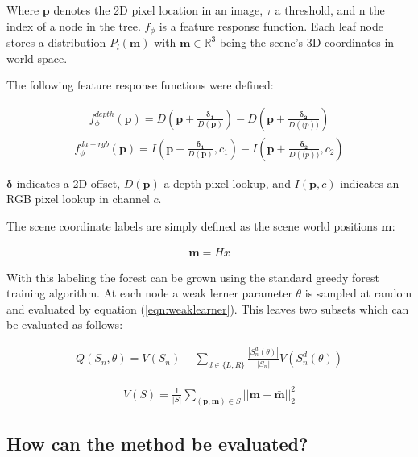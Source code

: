 Where $\mathbf{p}$ denotes the 2D pixel location in an image, $\tau$ a threshold, and n the index of a node in the tree. $f_{\phi}$ is a feature response function. Each leaf node stores a distribution $P_{l}(\mathbf{m})$ with $\mathbf{m} \in \mathbb{R}^3$ being the scene's 3D coordinates in world space.

The following feature response functions were defined:

\begin{eqnarray}
  f_{\phi}^{depth}(\mathbf{p}) = D(\mathbf{p} + \frac{\mathbf{\delta_1}}{D(\mathbf{p})}) - D(\mathbf{p} + \frac{\mathbf{\delta_2}}{D(\mathbf(p))})
\end{eqnarray}
\begin{eqnarray}
  f_{\phi}^{da-rgb}(\mathbf{p}) = I(\mathbf{p} + \frac{\mathbf{\delta_1}}{D(\mathbf{p})},c_1) - I(\mathbf{p} + \frac{\mathbf{\delta_2}}{D(\mathbf(p))},c_2)
\end{eqnarray}

$\mathbf{\delta}$ indicates a 2D offset, $D(\mathbf{p})$ a depth pixel lookup, and $I(\mathbf{p},c)$ indicates an RGB pixel lookup in channel $c$.

The scene coordinate labels are simply defined as the scene world positions $\mathbf{m}$:

\begin{eqnarray*}
  \mathbf{m} = Hx
\end{eqnarray*}

With this labeling the forest can be grown using the standard greedy forest training algorithm. At each node a weak lerner parameter $\theta$ is sampled at random and evaluated by equation (\ref{eqn:weaklearner}). This leaves two subsets which can be evaluated as follows:


\begin{eqnarray}
  Q(S_n,\theta) = V(S_n) - \sum_{d\in\{L,R\}}{\frac{|S_n^d(\theta)|}{|S_n|}V(S_n^d(\theta))}
\end{eqnarray}

\begin{eqnarray}
  V(S) = \frac{1}{|S|} \sum_{(\mathbf{p},\mathbf{m}) \in S}{||\mathbf{m} - \mathbf{\bar m}||_2^2}
\end{eqnarray}



\subsection{How can the method be evaluated?} %
\label{sub:how_can_the_method_be_evaluated_}

